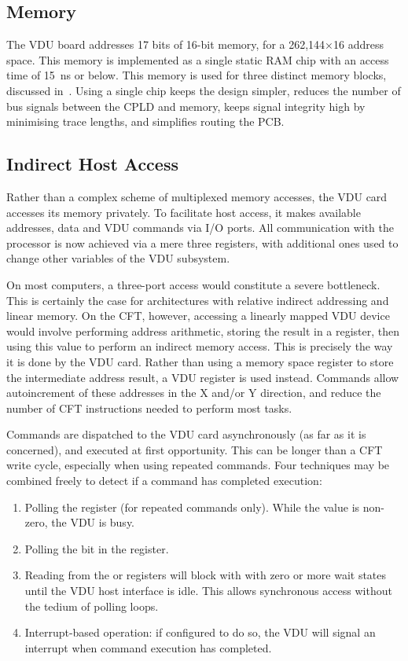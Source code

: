\subsection{Memory}

The VDU board addresses 17 bits of 16-bit memory, for a 262,144×16 address
space. This memory is implemented as a single static RAM chip with an access
time of 15~ns or below. This memory is used for three distinct memory blocks,
discussed in~. Using a single chip keeps the design
simpler, reduces the number of bus signals between the CPLD and memory, keeps
signal integrity high by minimising trace lengths, and simplifies routing the
PCB.

\subsection{Indirect Host Access}

Rather than a complex scheme of multiplexed memory accesses, the VDU card
accesses its memory privately. To facilitate host access, it makes available
addresses, data and VDU commands via I/O ports. All communication with the
processor is now achieved via a mere three registers, with additional ones used
to change other variables of the VDU subsystem.

On most computers, a three-port access would constitute a severe
bottleneck. This is certainly the case for architectures with relative indirect
addressing and linear memory. On the CFT, however, accessing a linearly mapped
VDU device would involve performing address arithmetic, storing the result in a
register, then using this value to perform an indirect memory access. This is
precisely the way it is done by the VDU card. Rather than using a memory space
register to store the intermediate address result, a VDU register is used
instead. Commands allow autoincrement of these addresses in the X and/or Y
direction, and reduce the number of CFT instructions needed to perform most
tasks.

Commands are dispatched to the VDU card asynchronously (as far as it is
concerned), and executed at first opportunity. This can be longer than a CFT
write cycle, especially when using repeated commands. Four techniques may be
combined freely to detect if a command has completed execution:

\begin{enumerate}
\item Polling the  register (for repeated commands only). While the
  value is non-zero, the VDU is busy.
\item Polling the  bit in the  register.
\item Reading from the  or  registers will block with
  with zero or more wait states until the VDU host interface is idle. This
  allows synchronous access without the tedium of polling loops.
\item Interrupt-based operation: if configured to do so, the VDU will signal an
  interrupt when command execution has completed.
\end{enumerate}

